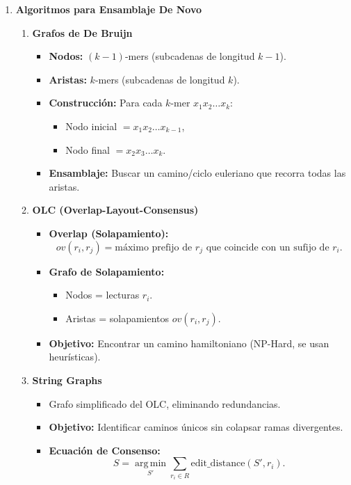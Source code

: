 \documentclass[fleqn,10pt]{article}
\begin{document}
\begin{enumerate}
    \item \textbf{Algoritmos para Ensamblaje De Novo}
    \begin{enumerate}[label=\alph*)]
        \item \textbf{Grafos de De Bruijn}
        \begin{itemize}
            \item \textbf{Nodos:} $(k-1)$-mers (subcadenas de longitud $k-1$).
            \item \textbf{Aristas:} $k$-mers (subcadenas de longitud $k$).
            \item \textbf{Construcción:} Para cada $k$-mer $x_1x_2\dots x_k$:
            \begin{itemize}
                \item Nodo inicial $= x_1x_2\dots x_{k-1}$,
                \item Nodo final $= x_2x_3\dots x_k$.
            \end{itemize}
            \item \textbf{Ensamblaje:} Buscar un camino/ciclo euleriano que recorra todas las aristas.
        \end{itemize}

        \item \textbf{OLC (Overlap-Layout-Consensus)}
        \begin{itemize}
            \item \textbf{Overlap (Solapamiento):}
            \[ ov(r_i, r_j) = \text{máximo prefijo de } r_j \text{ que coincide con un sufijo de } r_i. \]
            \item \textbf{Grafo de Solapamiento:}
            \begin{itemize}
                \item Nodos = lecturas $r_i$.
                \item Aristas = solapamientos $ov(r_i, r_j)$.
            \end{itemize}
            \item \textbf{Objetivo:} Encontrar un camino hamiltoniano (NP-Hard, se usan heurísticas).
        \end{itemize}

        \item \textbf{String Graphs}
        \begin{itemize}
            \item Grafo simplificado del OLC, eliminando redundancias.
            \item \textbf{Objetivo:} Identificar caminos únicos sin colapsar ramas divergentes.
            \item \textbf{Ecuación de Consenso:}
            \[ S = \operatorname*{arg\,min}_{S'} \sum_{r_i \in R} \text{edit\_distance}(S', r_i). \]
        \end{itemize}
    \end{enumerate}
\end{enumerate}
\end{document}
